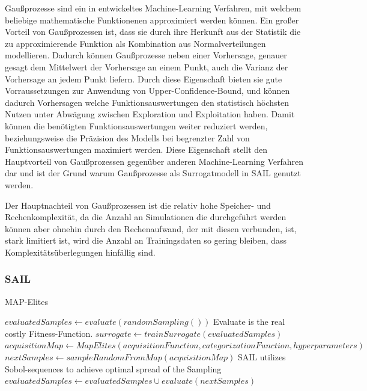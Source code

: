 
Gaußprozesse sind ein in \cite{Rasmussen.2008} entwickeltes Machine-Learning Verfahren, mit welchem beliebige mathematische Funktionenen approximiert werden können. 
Ein großer Vorteil von Gaußprozessen ist, dass sie durch ihre Herkunft aus der Statistik die zu approximierende Funktion als Kombination aus Normalverteilungen modellieren.
Dadurch können Gaußprozesse neben einer Vorhersage, genauer gesagt dem Mittelwert der Vorhersage an einem Punkt, auch die Varianz der Vorhersage an jedem Punkt liefern.
Durch diese Eigenschaft bieten sie gute Vorraussetzungen zur Anwendung von Upper-Confidence-Bound, und können dadurch Vorhersagen welche Funktionsauswertungen den statistisch höchsten Nutzen unter Abwägung zwischen Exploration und Exploitation haben.
Damit können die benötigten Funktionsauswertungen weiter reduziert werden, beziehungsweise die Präzision des Modells bei begrenzter Zahl von Funktionsauswertungen maximiert werden.
Diese Eigenschaft stellt den Hauptvorteil von Gaußprozessen gegenüber anderen Machine-Learning Verfahren dar und ist der Grund warum Gaußprozesse als Surrogatmodell in SAIL genutzt werden.



Der Hauptnachteil von Gaußprozessen ist die relativ hohe Speicher- und Rechenkomplexität, da die Anzahl an Simulationen die durchgeführt werden können aber ohnehin durch den Rechenaufwand, der mit diesen verbunden, ist, stark limitiert ist, wird die Anzahl an Trainingsdaten so gering bleiben, dass Komplexitätsüberlegungen hinfällig sind.



\subsubsection{SAIL}

\begin{algorithm}
	\caption{MAP-Elites} \label{alg:mapElites}
	\begin{algorithmic}[1]
\State $evaluatedSamples \gets evaluate(randomSampling())$ \Comment Evaluate is the real costly Fitness-Function.
\Else
\State $surrogate \gets trainSurrogate(evaluatedSamples)$
\State $acquisitionMap \gets MapElites(acquisitionFunction,categorizationFunction,hyperparameters)$
\State $nextSamples \gets sampleRandomFromMap(acquisitionMap)$ \Comment SAIL utilizes Sobol-sequences to achieve optimal spread of the Sampling
\State $evaluatedSamples \gets evaluatedSamples \cup evaluate(nextSamples)$
\EndIf
			\EndWhile
		\EndProcedure
	\end{algorithmic}
\end{algorithm}

